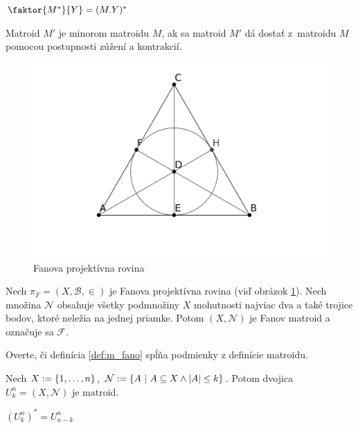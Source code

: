 \begin{theorem_hard}
$\faktor{M^*}{Y}  = (M.Y)^*$
\end{theorem_hard}

\begin{definition}
Matroid $M'$ je minorom matroidu $M$, ak sa matroid $M'$ dá dostať z~matroidu $M$ pomocou postupnosti zúžení a kontrakcií.
\end{definition}

\begin{figure}
    \centering
    \includegraphics[scale=0.3]{fano2.pdf}
    \caption{Fanova projektívna rovina}
    \label{fig:fano_fpp}
\end{figure}


\begin{definition}
\label{def:m_fano}
Nech $\pi_F = (X, \mathcal{B}, \in)$ je Fanova projektívna rovina (viď obrázok \ref{fig:fano_fpp}).
Nech množina $\mathcal{N}$ obsahuje všetky podmnožiny $X$ mohutnosti najviac dva a také trojice bodov, ktoré neležia na jednej priamke.
Potom $(X, \mathcal{N})$ je Fanov matroid a označuje sa $\mathcal{F}$.
\end{definition}

\begin{exercise}
Overte, či definícia \ref{def:m_fano} spĺňa podmienky z definície matroidu.
\end{exercise}


\begin{definition}
Nech $X:=\left\{1, \ldots, n\right\}$, $\mathcal{N}:=\left\{A ~|~ A \subseteq X \wedge \left|A\right| \leq k\right\}$. Potom 
dvojica $U_k^n = (X, \mathcal{N})$ je matroid.
\end{definition}

\begin{theorem}
\label{th:m_unk}
$(U_k^n)^* = U_{n-k}^n$
\end{theorem}


